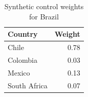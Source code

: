 \begin{table}[ht]
\centering
\begin{tabular}{lr}
  \hline
Country & Weight \\ 
  \hline
Chile & 0.78 \\ 
  Colombia & 0.03 \\ 
  Mexico & 0.13 \\ 
  South Africa & 0.07 \\ 
   \hline
\end{tabular}
\caption{Synthetic control weights for Brazil} 
\label{tab:weights}
\end{table}

